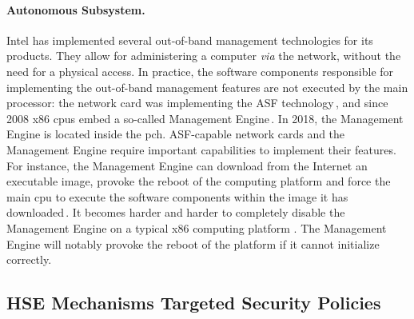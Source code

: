 \paragraph{Autonomous Subsystem.}
%
Intel has implemented several out-of-band management technologies for its
products.
%
They allow for administering a computer \emph{via} the network, without the need
for a physical access.
%
In practice, the software components responsible for implementing the
out-of-band management features are not executed by the main processor: the
network card was implementing  the ASF technology\,\cite{duflot2010network}, and
since 2008 x86 \acp{cpu}  embed a so-called Management
Engine\,\cite{ruan2014me,skochinsky2014intel}.
%
In 2018, the Management Engine is located inside the \ac{pch}.
%
ASF-capable network cards and the Management Engine require important
capabilities to implement their features.
%
For instance, the Management Engine can download from the Internet an executable
image, provoke the reboot of the computing platform and force the main \ac{cpu}
to execute the software components within the image it has
downloaded\,\cite{kumar2009active}.
%
It becomes harder and harder to completely disable the Management Engine on a
typical x86 computing platform .
%
The Management Engine will notably provoke the reboot of the platform if it
cannot initialize correctly.

\subsection{HSE Mechanisms Targeted Security Policies}
\label{subsec:usecase:targetedsec}

